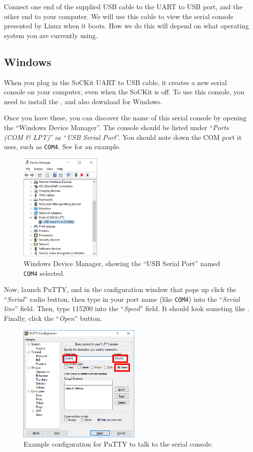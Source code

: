 \documentclass{sockitguide}
\begin{document}
Connect one end of the supplied USB cable to the UART to USB port, and
the other end to your computer. We will use this cable to view the
serial console presented by Linux when it boots. How we do this will
depend on what operating system you are currently using.

\subsection{Windows}

When you plug in the SoCKit UART to USB cable, it creates a new serial
console on your computer, even when the SoCKit is off. To use this
console, you need to install the , and also download
for Windows.

Once you have these, you can discover the name of this serial console
by opening the ``Windows Device Manager''. The console should be
listed under ``\textit{Ports (COM \& LPT)}'' as ``\textit{USB Serial
  Port}''. You should note down the COM port it uses, such as
\texttt{COM4}. See  for an example.

\begin{figure}
  \includegraphics[width=4cm]{figures/devicemanager.png}
  \caption{Windows Device Manager, showing the ``USB Serial Port''
    named \texttt{COM4} selected.}
  \label{fig:devman}
\end{figure}

Now, launch PuTTY, and in the configuration window that pops up click
the ``\textit{Serial}'' radio button, then type in your port name
(like \texttt{COM4}) into the ``\textit{Serial line}'' field. Then,
type \num{115200} into the ``\textit{Speed}'' field. It should look
someting like . Finally, click the ``\textit{Open}''
button.

\begin{figure}
  \includegraphics[width=6cm]{figures/putty.png}
  \caption{Example configuration for PuTTY to talk to the serial console.}
  \label{fig:putty}
\end{figure}
\end{document}
